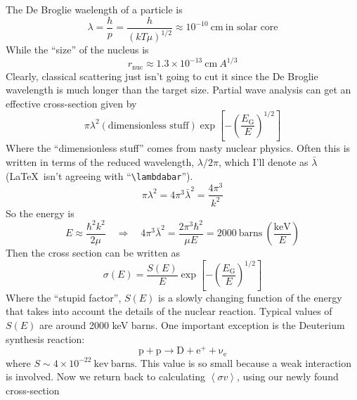 \documentclass[10pt]{article}
\numberwithin{equation}{section}
\newcommand{\avg}[1]{\left\langle#1\right\rangle}
\begin{document}
  The De Broglie waelength of a particle is 
  \begin{equation}
    \label{eq:121}
    \lambda = \frac{h}{p}=\frac{h}{\left(kT\mu\right)^{1/2}}\approx
    10^{-10}\ \mathrm{cm}\ \textrm{in solar core}
  \end{equation}
  While the ``size'' of the nucleus is
  \begin{equation}
    \label{eq:122}
    r_{\mathrm{nuc}}\approx 1.3\times 10^{-13}\ \mathrm{cm}\ A^{1/3}
  \end{equation}
  Clearly, classical scattering just isn't going to cut it since the
  De Broglie wavelength is much longer than the target size. Partial
  wave analysis can get an effective cross-section given by
  \begin{equation}
    \label{eq:123}
    \pi\lambda^2\left(\textrm{dimensionless stuff}\right)\exp\left[-\left(\frac{E_\mathrm{G}}{E}\right)^{1/2}\right]
  \end{equation}
  Where the ``dimensionless stuff'' comes from nasty nuclear
  physics. Often this is written in terms of the reduced wavelength,
  $\lambda/2\pi$, which I'll denote as $\bar{\lambda}$ (\LaTeX\ isn't
  agreeing with ``\verb!\lambdabar!'').
  \begin{equation}
    \label{eq:124}
    \pi\lambda^2=4\pi^3\bar{\lambda}^2=\frac{4\pi^3}{k^2}
  \end{equation}
  So the energy is
  \begin{equation}
    \label{eq:125}
    E\approx \frac{\hbar^2k^2}{2\mu}\quad\Rightarrow\quad
    4\pi^3\bar{\lambda}^2=\frac{2\pi^3\hbar^2}{\mu E}=2000\
    \mathrm{barns}\ \left(\frac{\mathrm{keV}}{E}\right)
  \end{equation}
  Then the cross section can be written as
  \begin{equation}
    \label{eq:126}
    \sigma(E)=\frac{S(E)}{E}\exp\left[-\left(\frac{E_{\mathrm{G}}}{E}\right)^{1/2}\right]
  \end{equation}
  Where the ``stupid factor'', $S(E)$ is a slowly changing function of
  the energy that takes into account the details of the nuclear
  reaction. Typical values of $S(E)$ are around 2000 keV barns. One
  important exception is the Deuterium synthesis reaction:
  \begin{equation}
    \label{eq:127}
    \mathrm{p+p\to D+e^++\nu_e}
  \end{equation}
  where $S\sim 4\times 10^{-22}\ \mathrm{kev\ barns}$. This value is
  so small because a weak interaction is involved. Now we return back
  to calculating $\avg{\sigma v}$, using our newly found cross-section
\end{document}
